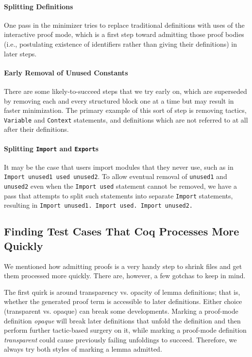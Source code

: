 \documentclass[a4paper,USenglish,cleveref,autoref,thm-restate]{lipics-v2021}
\begin{document}
\paragraph{Splitting Definitions}
One pass in the minimizer tries to replace traditional definitions with uses of the interactive proof mode, which is a first step toward admitting those proof bodies (i.e., postulating existence of identifiers rather than giving their definitions) in later steps.

\paragraph{Early Removal of Unused Constants}
There are some likely-to-succeed steps that we try early on, which are superseded by removing each and every structured block one at a time but may result in faster minimization.
The primary example of this sort of step is removing tactics, \verb|Variable| and \verb|Context| statements, and definitions which are not referred to at all after their definitions.

\paragraph{Splitting \texttt{Import} and \texttt{Export}s}\label{sec:split-imports}
It may be the case that users import modules that they never use, such as in \texttt{Import unused1 used unused2}.
To allow eventual removal of \verb|unused1| and \verb|unused2| even when the \verb|Import used| statement cannot be removed, we have a pass that attempts to split such statements into separate \verb|Import| statements, resulting in \texttt{Import unused1. Import used. Import unused2.}

\subsection{Finding Test Cases That Coq Processes More Quickly}

We mentioned how admitting proofs is a very handy step to shrink files and get them processed more quickly.
There are, however, a few gotchas to keep in mind.

The first quirk is around transparency vs. opacity of lemma definitions; that is, whether the generated proof term is accessible to later definitions.
Either choice (transparent vs. opaque) can break some developments.
Marking a proof-mode definition \emph{opaque} will break later definitions that unfold the definition and then perform further tactic-based surgery on it, while marking a proof-mode definition \emph{transparent} could cause previously failing unfoldings to succeed.
Therefore, we always try both styles of marking a lemma admitted.
\end{document}
